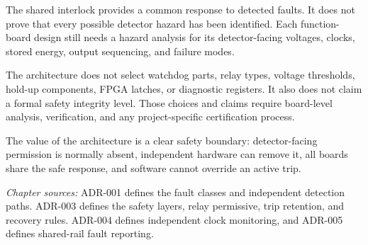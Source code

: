 The shared interlock provides a common response to detected faults. It does not prove that every possible detector hazard has been identified. Each function-board design still needs a hazard analysis for its detector-facing voltages, clocks, stored energy, output sequencing, and failure modes.

The architecture does not select watchdog parts, relay types, voltage thresholds, hold-up components, FPGA latches, or diagnostic registers. It also does not claim a formal safety integrity level. Those choices and claims require board-level analysis, verification, and any project-specific certification process.

The value of the architecture is a clear safety boundary: detector-facing permission is normally absent, independent hardware can remove it, all boards share the safe response, and software cannot override an active trip.

\medskip
\noindent\textit{Chapter sources:} ADR-001 defines the fault classes and independent detection paths. ADR-003 defines the safety layers, relay permissive, trip retention, and recovery rules. ADR-004 defines independent clock monitoring, and ADR-005 defines shared-rail fault reporting.
